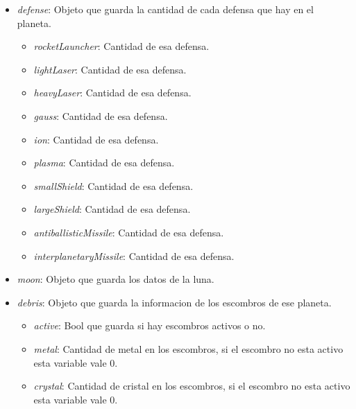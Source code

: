 \documentclass{article}
\begin{document}
\begin{itemize}[noitemsep]
\begin{itemize}[noitemsep]
    \end{itemize}
    \item \textit{defense}: Objeto que guarda la cantidad de cada defensa que hay en el planeta.
    \begin{itemize}[noitemsep]
        \item \textit{rocketLauncher}: Cantidad de esa defensa.
        \item \textit{lightLaser}: Cantidad de esa defensa.
        \item \textit{heavyLaser}: Cantidad de esa defensa.
        \item \textit{gauss}: Cantidad de esa defensa.
        \item \textit{ion}: Cantidad de esa defensa.
        \item \textit{plasma}: Cantidad de esa defensa.
        \item \textit{smallShield}: Cantidad de esa defensa.
        \item \textit{largeShield}: Cantidad de esa defensa.
        \item \textit{antiballisticMissile}: Cantidad de esa defensa.
        \item \textit{interplanetaryMissile}: Cantidad de esa defensa.
    \end{itemize}
    \item \textit{moon}: Objeto que guarda los datos de la luna.
    \item \textit{debris}: Objeto que guarda la informacion de los escombros de ese planeta.
    \begin{itemize}[noitemsep]
        \item \textit{active}: Bool que guarda si hay escombros activos o no.
        \item \textit{metal}: Cantidad de metal en los escombros, si el escombro no esta activo esta variable vale 0.
        \item \textit{crystal}: Cantidad de cristal en los escombros, si el escombro no esta activo esta variable vale 0.
    \end{itemize}
\end{itemize}
\end{document}
